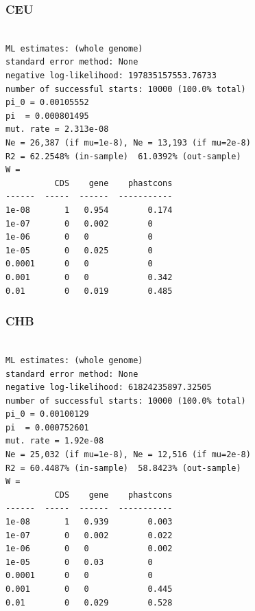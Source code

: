 \documentclass[11pt]{article}
\begin{document}
\subsubsection*{CEU}
\begin{minipage}{\linewidth}\begin{footnotesize}
\begin{verbatim}

ML estimates: (whole genome)
standard error method: None
negative log-likelihood: 197835157553.76733
number of successful starts: 10000 (100.0% total)
pi_0 = 0.00105552
pi  = 0.000801495
mut. rate = 2.313e-08 
Ne = 26,387 (if mu=1e-8), Ne = 13,193 (if mu=2e-8)
R2 = 62.2548% (in-sample)  61.0392% (out-sample)
W = 
          CDS    gene    phastcons
------  -----  ------  -----------
1e-08       1   0.954        0.174
1e-07       0   0.002        0
1e-06       0   0            0
1e-05       0   0.025        0
0.0001      0   0            0
0.001       0   0            0.342
0.01        0   0.019        0.485
\end{verbatim}
\end{footnotesize}\end{minipage}


\subsubsection*{CHB}
\begin{minipage}{\linewidth}\begin{footnotesize}
\begin{verbatim}

ML estimates: (whole genome)
standard error method: None
negative log-likelihood: 61824235897.32505
number of successful starts: 10000 (100.0% total)
pi_0 = 0.00100129
pi  = 0.000752601
mut. rate = 1.92e-08 
Ne = 25,032 (if mu=1e-8), Ne = 12,516 (if mu=2e-8)
R2 = 60.4487% (in-sample)  58.8423% (out-sample)
W = 
          CDS    gene    phastcons
------  -----  ------  -----------
1e-08       1   0.939        0.003
1e-07       0   0.002        0.022
1e-06       0   0            0.002
1e-05       0   0.03         0
0.0001      0   0            0
0.001       0   0            0.445
0.01        0   0.029        0.528
\end{verbatim}
\end{footnotesize}\end{minipage}
\end{document}
